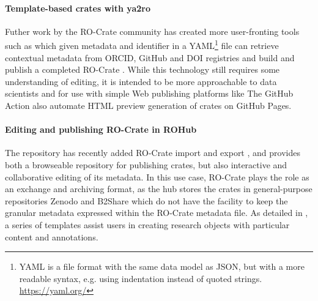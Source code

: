 \paragraph{Template-based crates with ya2ro}
Futher work by the RO-Crate community has created more user-fronting tools such as  which given metadata and identifier in a YAML\footnote{
  YAML is a file format with the same data model as JSON, but with a more readable syntax, e.g. using indentation instead of quoted strings.  \url{https://yaml.org/}} 
file can retrieve contextual metadata from ORCID, GitHub and DOI registries and build and publish a completed RO-Crate \cite{Pavel 2023}.   
While this technology still requires some understanding of editing, it is intended to be more approachable to data scientists and for use with simple Web publishing platforms like  The GitHub Action  also automate HTML preview generation of crates on GitHub Pages.

\paragraph{Editing and publishing RO-Crate in ROHub}
The repository  \cite{Garcia-Silva 2019} has recently added RO-Crate import and export \cite{Fouilloux 2023}, and provides both a browseable repository for publishing crates, but also interactive and collaborative editing of its metadata. 
In this use case, RO-Crate plays the role as an exchange and archiving format, as the hub stores the crates in general-purpose repositories Zenodo and B2Share which do not have the facility to keep the granular metadata expressed within the RO-Crate metadata file. As detailed in \cite{Fouilloux 2023}, a series of templates assist users in creating research objects with particular content and annotations. 

